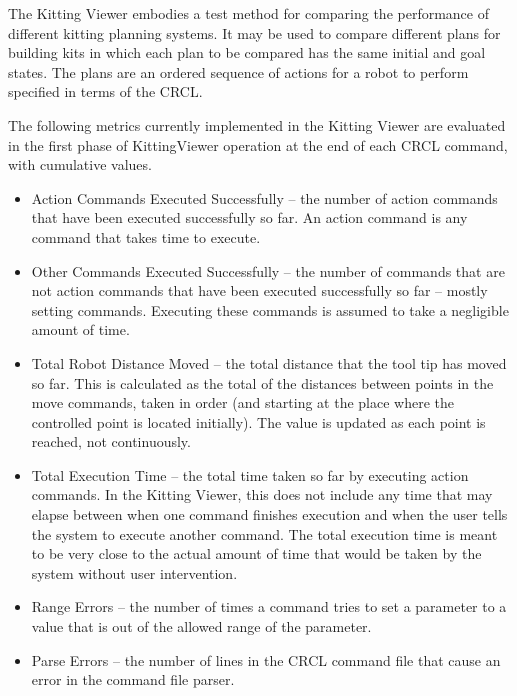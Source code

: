 The Kitting Viewer embodies a test method for comparing the performance of
different kitting planning systems. It may be used to compare different
plans for building kits in which each plan to be compared has the same
initial and goal states. The plans are an ordered sequence of actions for a
robot to perform specified in terms of the CRCL.

The following metrics currently implemented in the Kitting Viewer are
evaluated in the first phase of KittingViewer operation at the end of each
CRCL command, with cumulative values.

\begin{itemize}

\item \small \sf Action Commands Executed Successfully \rm \normalsize --
the number of action commands that have been executed successfully so far.
An action command is any command that takes time to execute.

\item \small \sf Other Commands Executed Successfully \rm \normalsize --
the number of commands that are not action commands that have been executed
successfully so far -- mostly setting commands. Executing these commands is
assumed to take a negligible amount of time.

\item \small \sf Total Robot Distance Moved \rm \normalsize -- the total
distance that the tool tip has moved so far. This is calculated as the
total of the distances between points in the move commands, taken in order
(and starting at the place where the controlled point is located
initially). The value is updated as each point is reached, not
continuously.

\item \small \sf Total Execution Time \rm \normalsize -- the total time
taken so far by executing action commands. In the Kitting Viewer, this does
not include any time that may elapse between when one command finishes
execution and when the user tells the system to execute another command.
The total execution time is meant to be very close to the actual amount of
time that would be taken by the system without user intervention.

\item \small \sf Range Errors \rm \normalsize -- the number of times a
command tries to set a parameter to a value that is out of the allowed
range of the parameter.

\item \small \sf Parse Errors \rm \normalsize -- the number of lines in
the CRCL command file that cause an error in the command file
parser.


\end{itemize}
